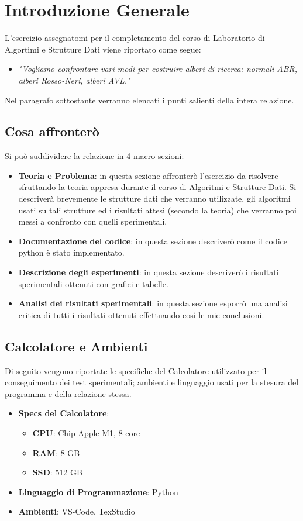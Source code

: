 \section{Introduzione Generale}
L'esercizio assegnatomi per il completamento del corso di Laboratorio di Algortimi e Strutture Dati viene riportato come segue:
\begin{itemize}
	\item {\textit  {"Vogliamo confrontare vari modi per costruire alberi di ricerca: normali ABR, alberi Rosso-Neri, alberi AVL."}}
\end{itemize}
	Nel paragrafo sottostante verranno elencati i punti salienti della intera relazione.

\subsection{Cosa affronterò}

Si può suddividere la relazione in 4 macro sezioni:

\begin{itemize}
	\item \textbf {Teoria e Problema}: in questa sezione affronterò l'esercizio da risolvere sfruttando la teoria appresa durante il corso di Algoritmi e Strutture Dati. Si descriverà brevemente le strutture dati che verranno utilizzate, gli algoritmi usati su tali strutture ed i risultati attesi (secondo la teoria) che verranno poi messi a confronto con quelli sperimentali.
	\item \textbf{Documentazione del codice}: in questa sezione descriverò come il codice python è stato implementato.
	\item \textbf{Descrizione degli esperimenti}: in questa sezione descriverò i risultati sperimentali ottenuti con grafici e tabelle.
	\item \textbf{Analisi dei risultati sperimentali}: in questa sezione esporrò una analisi critica di tutti i risultati ottenuti effettuando così le mie conclusioni.
\end{itemize}

\subsection{Calcolatore e Ambienti}
Di seguito vengono riportate le specifiche del Calcolatore utilizzato per il conseguimento dei test sperimentali; ambienti e linguaggio usati per la stesura del programma e della relazione stessa.

\begin{itemize}
	\item \textbf{Specs del Calcolatore}:
		\begin{itemize}
			\item \textbf{CPU}: Chip Apple M1, 8-core
			\item \textbf{RAM}: 8 GB
			\item \textbf{SSD}: 512 GB
		\end{itemize}
	\item \textbf{Linguaggio di Programmazione}: Python
	\item \textbf{Ambienti}: VS-Code, TexStudio
\end{itemize}